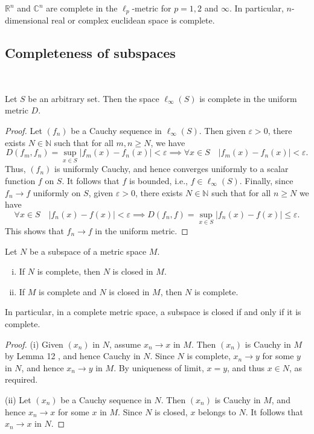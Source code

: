 \documentclass[a4paper,11pt]{article}
\begin{document}
\begin{corollary}
$\mathbb{R}^n$ and $\mathbb{C}^n$ are complete in the $\ell_p$-metric for $p=1,2$ and $\infty$. In particular, $n$-dimensional real or complex euclidean space is complete.
\end{corollary}

\subsection{Completeness of subspaces}\ \vspace{-1.5em}

\begin{theorem}
    Let $S$ be an arbitrary set. Then the space $\ell_{\infty}(S)$ is complete in the uniform metric $D$.
\end{theorem}
\begin{proof}
    Let $\left(f_n\right)$ be a Cauchy sequence in $\ell_{\infty}(S)$. Then given $\varepsilon>0$, there exists $N \in \mathbb{N}$ such that for all $m, n \geqslant N$, we have
    \[
        D\left(f_m, f_n\right)=\sup _{x \in S}\left|f_m(x)-f_n(x)\right|<\varepsilon \implies \forall x \in S \quad\left|f_m(x)-f_n(x)\right|<\varepsilon.
    \]
    Thus, $\left(f_n\right)$ is uniformly Cauchy, and hence converges uniformly to a scalar function $f$ on $S$. It follows that $f$ is bounded, i.e., $f \in \ell_{\infty}(S)$. Finally, since $f_n \rightarrow f$ uniformly on $S$, given $\varepsilon>0$, there exists $N \in \mathbb{N}$ such that for all $n \geqslant N$ we have
    \[
        \forall x \in S \quad\left|f_n(x)-f(x)\right|<\varepsilon \implies D\left(f_n, f\right)=\sup _{x \in S}\left|f_n(x)-f(x)\right| \leqslant \varepsilon.
    \]
    This shows that $f_n \rightarrow f$ in the uniform metric.
\end{proof}

\begin{proposition}
    Let $N$ be a subspace of a metric space $M$.
    \begin{enumerate}[(i)]
        \item If $N$ is complete, then $N$ is closed in $M$.
        \item If $M$ is complete and $N$ is closed in $M$, then $N$ is complete.
    \end{enumerate}In particular, in a complete metric space, a subspace is closed if and only if it is complete.
\end{proposition}
\begin{proof}
    (i) Given $\left(x_n\right)$ in $N$, assume $x_n \rightarrow x$ in $M$. Then $\left(x_n\right)$ is Cauchy in $M$ by Lemma 12 , and hence Cauchy in $N$. Since $N$ is complete, $x_n \rightarrow y$ for some $y$ in $N$, and hence $x_n \rightarrow y$ in $M$. By uniqueness of limit, $x=y$, and thus $x \in N$, as required.

    (ii) Let $\left(x_n\right)$ be a Cauchy sequence in $N$. Then $\left(x_n\right)$ is Cauchy in $M$, and hence $x_n \rightarrow x$ for some $x$ in $M$. Since $N$ is closed, $x$ belongs to $N$. It follows that $x_n \rightarrow x$ in $N$.
\end{proof}
\end{document}
